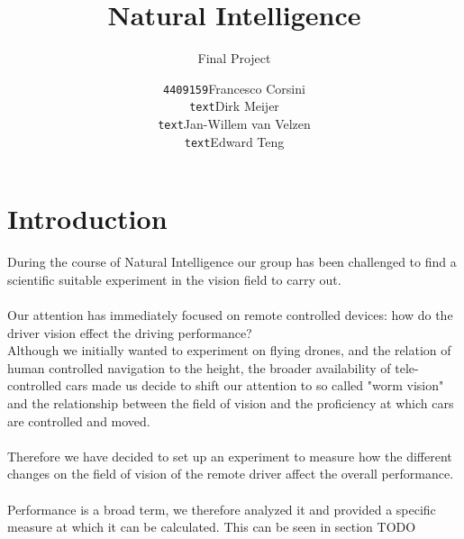 \documentclass[a4,11pt]{scrartcl}
\title{Natural Intelligence}
\subtitle{Final Project}
\author{
\begin{tabular}{ll}
\texttt{4409159}&Francesco Corsini\\
\texttt{text}&Dirk Meijer\\
\texttt{text}&Jan-Willem van Velzen\\
\texttt{text}&Edward Teng\\
\end{tabular}}
\begin{document}
\maketitle

\null\vfill


\section{Introduction}
During the course of Natural Intelligence our group has been challenged to find a scientific suitable experiment in the vision field to carry out. 
\\ \\
Our attention has immediately focused on remote controlled devices: how do the driver vision effect the driving performance? \\
 Although we initially wanted to experiment on flying drones, and the relation of human controlled navigation to the height, the broader availability of tele-controlled cars made us decide to shift our attention to so called "worm vision" and the relationship between the field of vision and the proficiency at which cars are controlled and moved.
 \\ \\
 Therefore we have decided to set up an experiment to measure how the different changes on the field of vision of the remote driver affect the overall performance. \\ \\
 Performance is a broad term, we therefore analyzed it and provided a specific measure at which it can be calculated. This can be seen in section TODO
\end{document}

